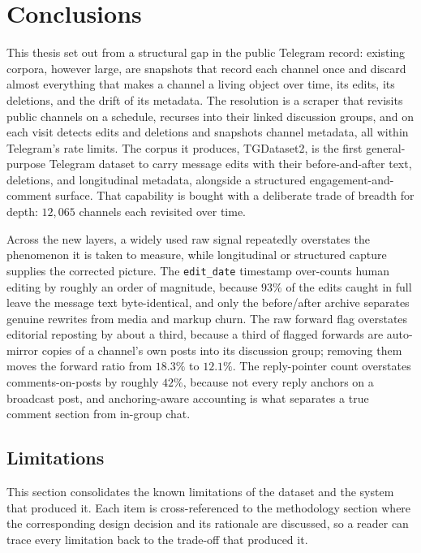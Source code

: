 \chapter{Conclusions}
\label{chap:conclusion}

This thesis set out from a structural gap in the public Telegram record: existing corpora, however large, are snapshots that record each channel once and discard almost everything that makes a channel a living object over time, its edits, its deletions, and the drift of its metadata. The resolution is a scraper that revisits public channels on a schedule, recurses into their linked discussion groups, and on each visit detects edits and deletions and snapshots channel metadata, all within Telegram's rate limits. The corpus it produces, TGDataset2, is the first general-purpose Telegram dataset to carry message edits with their before-and-after text, deletions, and longitudinal metadata, alongside a structured engagement-and-comment surface. That capability is bought with a deliberate trade of breadth for depth: $12{,}065$ channels each revisited over time.

Across the new layers, a widely used raw signal repeatedly overstates the phenomenon it is taken to measure, while longitudinal or structured capture supplies the corrected picture. The \texttt{edit\_date} timestamp over-counts human editing by roughly an order of magnitude, because $93\%$ of the edits caught in full leave the message text byte-identical, and only the before/after archive separates genuine rewrites from media and markup churn. The raw forward flag overstates editorial reposting by about a third, because a third of flagged forwards are auto-mirror copies of a channel's own posts into its discussion group; removing them moves the forward ratio from $18.3\%$ to $12.1\%$. The reply-pointer count overstates comments-on-posts by roughly $42\%$, because not every reply anchors on a broadcast post, and anchoring-aware accounting is what separates a true comment section from in-group chat.

\section{Limitations}
\label{sec:limitations}

This section consolidates the known limitations of the dataset and the system that produced it. Each item is cross-referenced to the methodology section where the corresponding design decision and its rationale are discussed, so a reader can trace every limitation back to the trade-off that produced it.

